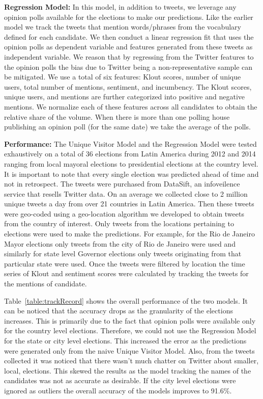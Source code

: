 \noindent
{\bf Regression Model:}
In this model, in addition to tweets, we leverage any opinion polls available for the elections 
to make our predictions.
Like the earlier model we track the tweets that mention words/phrases
from the vocabulary defined for each candidate.
We then conduct a linear regression fit that uses the opinion polls as dependent variable and features generated from 
these tweets as independent variable.
We reason that by regressing from the Twitter features to the opinion polls the bias due to Twitter being a non-representative sample
can be mitigated.
We use a total of six features: Klout scores, number of unique users, total number of mentions, sentiment, and incumbency.
The Klout scores, unique users, and mentions are further categorized into positive and negative mentions.
We normalize each of these features across all candidates to obtain the relative share of the volume. 
When there is more than one polling house publishing an opinion poll (for the same date) we take the average of the polls. 

\noindent
{\bf Performance:}
The Unique Visitor Model and the Regression Model were tested exhaustively on a total of 36 elections from Latin America during 2012 and 2014 ranging from local mayoral elections to presidential elections at the country level.
It is important to note that every single election was predicted ahead of time and not in retrospect.
The tweets were purchased from DataSift, an infoveilence service that resells Twitter data.
On an average we collected close to 2 million unique tweets a day from over 21 countries in Latin America.
Then these tweets were geo-coded using a geo-location algorithm we developed to obtain tweets from the country of interest.
Only tweets from the locations pertaining to elections were used to make the predictions.
For example, for the Rio de Janeiro Mayor elections only tweets from the city of Rio de Janeiro were used and similarly for state level Governor elections only tweets originating from that particular state were used.
Once the tweets were filtered by location the time series of Klout and sentiment scores were calculated by tracking the tweets for the mentions of candidate.

Table~\ref{table:trackRecord} shows the overall performance of the two models. 
It can be noticed that the accuracy drops as the granularity of the elections increases. 
This is primarily due to the fact that opinion polls were available only for the country level elections.
Therefore, we could not use the Regression Model for the state or city level elections.
This increased the error as the predictions were generated only from the naive Unique Visitor Model.
Also, from the tweets collected it was noticed that there wasn't much chatter on Twitter about 
smaller, local, elections.
This skewed the results as the model tracking the names of the candidates was not as accurate as desirable.
If the city level elections were ignored as outliers the overall accuracy of the models improves to 91.6\%.

